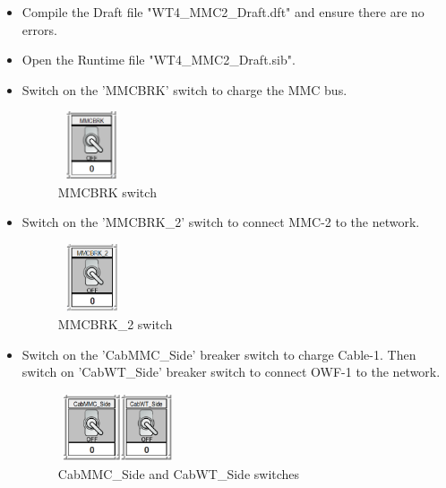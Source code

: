 \begin{itemize}
    \item Compile the Draft file "WT4\_MMC2\_Draft.dft" and ensure there are no errors.
    \item Open the Runtime file "WT4\_MMC2\_Draft.sib".
    \item Switch on the 'MMCBRK' switch to charge the \gls{MMC} bus.
    
    \begin{figure}[H]
\centering
    \includegraphics[height = 2cm,width = 2cm]{Diagrams/Appendix_C/MMCBRK.PNG}
    \caption{MMCBRK switch}
    \label{fig:MMCBRK}
\end{figure}
    
    \item Switch on the 'MMCBRK\_2' switch to connect \gls{MMC}-2 to the network.
    
    \begin{figure}[H]
\centering
    \includegraphics[height = 2cm,width = 2cm]{Diagrams/Appendix_C/MMCBRK_2.PNG}
    \caption{MMCBRK\_2 switch}
    \label{fig:MMCBRK_2}
\end{figure}
    
    \item Switch on the 'CabMMC\_Side' breaker switch to charge Cable-1. Then switch on 'CabWT\_Side' breaker switch to connect \gls{OWF}-1 to the network.
    
      \begin{figure}[H]
\centering
    \includegraphics[height = 2cm,width = 3.5cm]{Diagrams/Appendix_C/Cab_1.PNG}
    \caption{CabMMC\_Side and CabWT\_Side switches}
    \label{fig:Cab_1}
\end{figure}  
    

\end{itemize}
